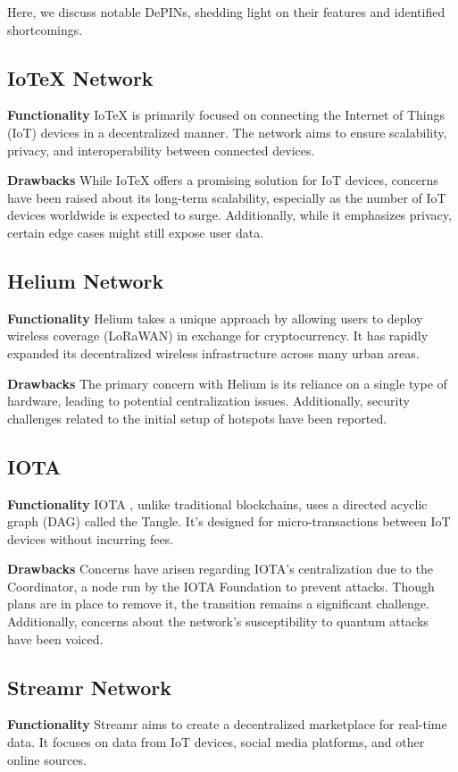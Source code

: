 \documentclass{article}
\begin{document}
Here, we discuss notable DePINs, shedding light on their features and identified shortcomings.

\subsection{IoTeX Network}
\textbf{Functionality} IoTeX \cite{raftopoulos2019iotex} is primarily focused on connecting the Internet of Things (IoT) devices in a decentralized manner. The network aims to ensure scalability, privacy, and interoperability between connected devices.

\textbf{Drawbacks} While IoTeX offers a promising solution for IoT devices, concerns have been raised about its long-term scalability, especially as the number of IoT devices worldwide is expected to surge. Additionally, while it emphasizes privacy, certain edge cases might still expose user data.

\subsection{Helium Network}
\textbf{Functionality} Helium \cite{hale2020helium} takes a unique approach by allowing users to deploy wireless coverage (LoRaWAN) in exchange for cryptocurrency. It has rapidly expanded its decentralized wireless infrastructure across many urban areas.

\textbf{Drawbacks} The primary concern with Helium is its reliance on a single type of hardware, leading to potential centralization issues. Additionally, security challenges related to the initial setup of hotspots have been reported.

\subsection{IOTA}
\textbf{Functionality} IOTA \cite{popov2018tangle}, unlike traditional blockchains, uses a directed acyclic graph (DAG) called the Tangle. It's designed for micro-transactions between IoT devices without incurring fees.

\textbf{Drawbacks} Concerns have arisen regarding IOTA's centralization due to the Coordinator, a node run by the IOTA Foundation to prevent attacks. Though plans are in place to remove it, the transition remains a significant challenge. Additionally, concerns about the network's susceptibility to quantum attacks have been voiced.

\subsection{Streamr Network}
\textbf{Functionality} Streamr \cite{patel2021streamr} aims to create a decentralized marketplace for real-time data. It focuses on data from IoT devices, social media platforms, and other online sources.
\end{document}
